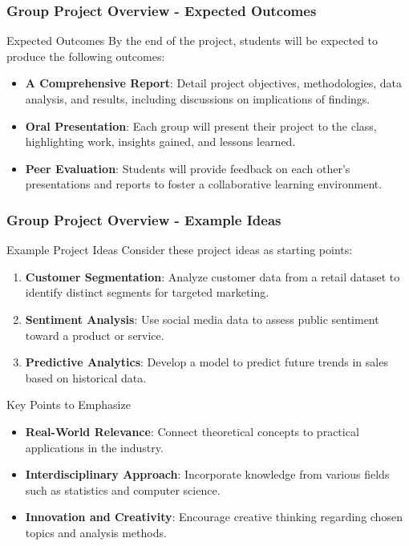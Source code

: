 \documentclass[aspectratio=169]{beamer}
\begin{document}
\begin{frame}[fragile]
    \frametitle{Group Project Overview - Expected Outcomes}
    \begin{block}{Expected Outcomes}
        By the end of the project, students will be expected to produce the following outcomes:
    \end{block}
    \begin{itemize}
        \item \textbf{A Comprehensive Report}: Detail project objectives, methodologies, data analysis, and results, including discussions on implications of findings.
        \item \textbf{Oral Presentation}: Each group will present their project to the class, highlighting work, insights gained, and lessons learned.
        \item \textbf{Peer Evaluation}: Students will provide feedback on each other's presentations and reports to foster a collaborative learning environment.
    \end{itemize}
\end{frame}

\begin{frame}[fragile]
    \frametitle{Group Project Overview - Example Ideas}
    \begin{block}{Example Project Ideas}
        Consider these project ideas as starting points:
    \end{block}
    \begin{enumerate}
        \item \textbf{Customer Segmentation}: Analyze customer data from a retail dataset to identify distinct segments for targeted marketing.
        \item \textbf{Sentiment Analysis}: Use social media data to assess public sentiment toward a product or service.
        \item \textbf{Predictive Analytics}: Develop a model to predict future trends in sales based on historical data.
    \end{enumerate}
    
    \begin{block}{Key Points to Emphasize}
        \begin{itemize}
            \item \textbf{Real-World Relevance}: Connect theoretical concepts to practical applications in the industry.
            \item \textbf{Interdisciplinary Approach}: Incorporate knowledge from various fields such as statistics and computer science.
            \item \textbf{Innovation and Creativity}: Encourage creative thinking regarding chosen topics and analysis methods.
        \end{itemize}
    \end{block}
\end{frame}
\end{document}
